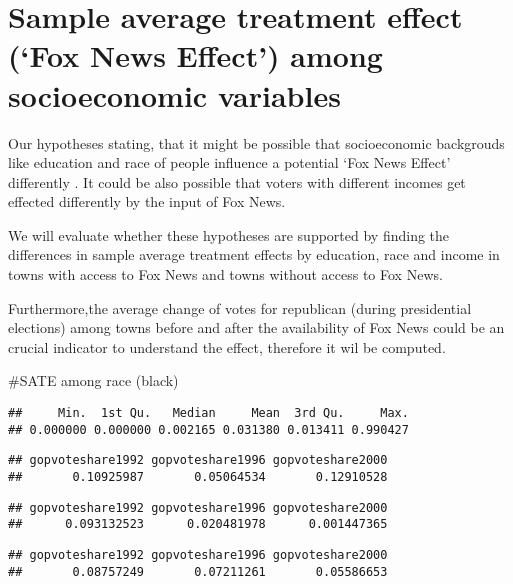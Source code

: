 \documentclass[
]{article}
\begin{document}
\hypertarget{sample-average-treatment-effect-fox-news-effect-among-socioeconomic-variables}{%
\section{Sample average treatment effect (`Fox News Effect') among socioeconomic variables}\label{sample-average-treatment-effect-fox-news-effect-among-socioeconomic-variables}}

Our hypotheses stating, that it might be possible that socioeconomic backgrouds like education and race of people influence a potential `Fox News Effect' differently . It could be also possible that voters with different incomes get effected differently by the input of Fox News.

We will evaluate whether these hypotheses are supported by finding the differences in sample average treatment effects by education, race and income in towns with access to Fox News and towns without access to Fox News.

Furthermore,the average change of votes for republican (during presidential elections) among towns before and after the availability of Fox News could be an crucial indicator to understand the effect, therefore it wil be computed.

\#SATE among race (black)

\begin{verbatim}
##     Min.  1st Qu.   Median     Mean  3rd Qu.     Max. 
## 0.000000 0.000000 0.002165 0.031380 0.013411 0.990427
\end{verbatim}

\begin{verbatim}
## gopvoteshare1992 gopvoteshare1996 gopvoteshare2000 
##       0.10925987       0.05064534       0.12910528
\end{verbatim}

\begin{verbatim}
## gopvoteshare1992 gopvoteshare1996 gopvoteshare2000 
##      0.093132523      0.020481978      0.001447365
\end{verbatim}

\begin{verbatim}
## gopvoteshare1992 gopvoteshare1996 gopvoteshare2000 
##       0.08757249       0.07211261       0.05586653
\end{verbatim}
\end{document}
